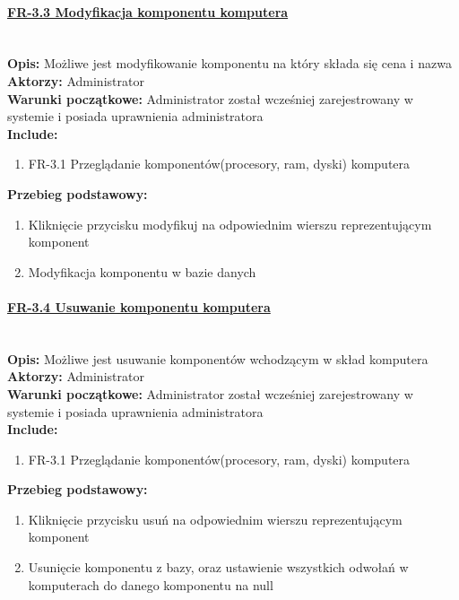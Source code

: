 \paragraph{\underline{FR-3.3 Modyfikacja komponentu komputera}}\mbox{}\\[1mm]
	\noindent\textbf{Opis:} Możliwe jest modyfikowanie komponentu na który składa się cena i nazwa\\
	\noindent\textbf{Aktorzy:} Administrator\\
	\textbf{Warunki początkowe:} Administrator został wcześniej zarejestrowany w systemie i posiada uprawnienia administratora\\
	\textbf{Include:} 
	\begin{enumerate}[noparskip]
		\item FR-3.1 Przeglądanie komponentów(procesory, ram, dyski) komputera
	\end{enumerate}
    \textbf{Przebieg podstawowy:}
	\begin{enumerate}[noparskip]
		\item Kliknięcie przycisku modyfikuj na odpowiednim wierszu reprezentującym komponent
		\item Modyfikacja komponentu w bazie danych
    \end{enumerate}

\paragraph{\underline{FR-3.4 Usuwanie komponentu komputera}}\mbox{}\\[1mm]
	\noindent\textbf{Opis:} Możliwe jest usuwanie komponentów wchodzącym w skład komputera\\
	\noindent\textbf{Aktorzy:} Administrator\\
	\textbf{Warunki początkowe:} Administrator został wcześniej zarejestrowany w systemie i posiada uprawnienia administratora\\
	\textbf{Include:} 
	\begin{enumerate}[noparskip]
		\item FR-3.1 Przeglądanie komponentów(procesory, ram, dyski) komputera
	\end{enumerate}
    \textbf{Przebieg podstawowy:}
	\begin{enumerate}[noparskip]
		\item Kliknięcie przycisku usuń na odpowiednim wierszu reprezentującym komponent
		\item Usunięcie komponentu z bazy, oraz ustawienie wszystkich odwołań w komputerach do danego komponentu na null
    \end{enumerate}

